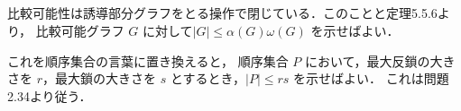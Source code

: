 \subsection{}
比較可能性は誘導部分グラフをとる操作で閉じている．このことと定理5.5.6より，
比較可能グラフ $G$ に対して$|G|\leq \alpha(G)\omega(G)$ を示せばよい．

これを順序集合の言葉に置き換えると，
順序集合 $P$ において，最大反鎖の大きさを $r$，最大鎖の大きさを $s$ とするとき，$|P|\leq rs$ を示せばよい．
これは問題2.34より従う．
